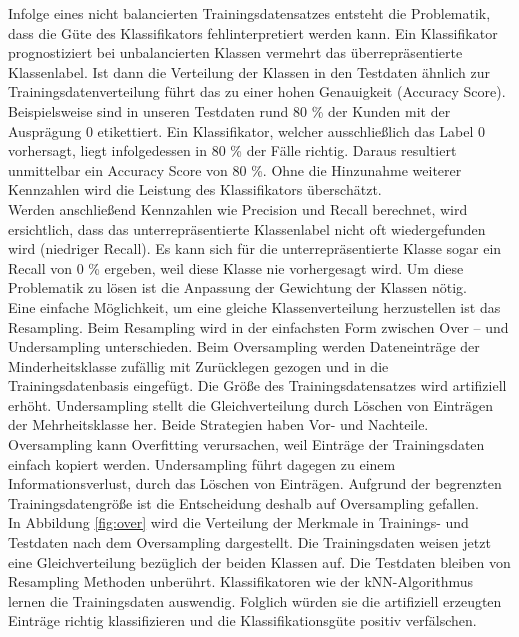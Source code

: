  Infolge eines nicht balancierten Trainingsdatensatzes entsteht die Problematik, dass die Güte des Klassifikators fehlinterpretiert werden kann. Ein Klassifikator prognostiziert bei unbalancierten Klassen vermehrt das überrepräsentierte Klassenlabel. Ist dann die Verteilung der Klassen in den Testdaten ähnlich zur Trainingsdatenverteilung führt das zu einer hohen Genauigkeit (Accuracy Score). Beispielsweise sind in unseren Testdaten rund 80 \% der Kunden mit der Ausprägung 0 etikettiert. Ein Klassifikator, welcher ausschließlich das Label 0 vorhersagt, liegt infolgedessen in 80 \% der Fälle richtig. Daraus resultiert unmittelbar ein Accuracy Score von 80 \%. Ohne die Hinzunahme weiterer Kennzahlen wird die Leistung des Klassifikators überschätzt.\\
 
Werden anschließend Kennzahlen wie Precision und Recall berechnet, wird ersichtlich, dass das unterrepräsentierte Klassenlabel nicht oft wiedergefunden wird (niedriger Recall). Es kann sich für die unterrepräsentierte Klasse sogar ein Recall von 0 \% ergeben, weil diese Klasse nie vorhergesagt wird. Um diese Problematik zu lösen ist die Anpassung der Gewichtung der Klassen nötig.\\

Eine einfache Möglichkeit, um eine gleiche Klassenverteilung herzustellen ist das Resampling. Beim Resampling wird in der einfachsten Form zwischen Over – und Undersampling unterschieden. Beim Oversampling werden Dateneinträge der Minderheitsklasse zufällig mit Zurücklegen gezogen und in die Trainingsdatenbasis eingefügt. Die Größe des Trainingsdatensatzes wird artifiziell erhöht. Undersampling stellt die Gleichverteilung durch Löschen von Einträgen der Mehrheitsklasse her. Beide Strategien haben Vor- und Nachteile. Oversampling kann Overfitting verursachen, weil Einträge der Trainingsdaten einfach kopiert werden. Undersampling führt dagegen zu einem Informationsverlust, durch das Löschen von Einträgen. Aufgrund der begrenzten Trainingsdatengröße ist die Entscheidung deshalb auf Oversampling gefallen.\\ 

In Abbildung \ref{fig:over} wird die Verteilung der Merkmale in Trainings- und Testdaten nach dem Oversampling dargestellt. Die Trainingsdaten weisen jetzt eine Gleichverteilung bezüglich der beiden Klassen auf. Die Testdaten bleiben von Resampling Methoden unberührt. Klassifikatoren wie der kNN-Algorithmus lernen die Trainingsdaten auswendig. Folglich würden sie die artifiziell erzeugten Einträge richtig klassifizieren und die Klassifikationsgüte positiv verfälschen.

